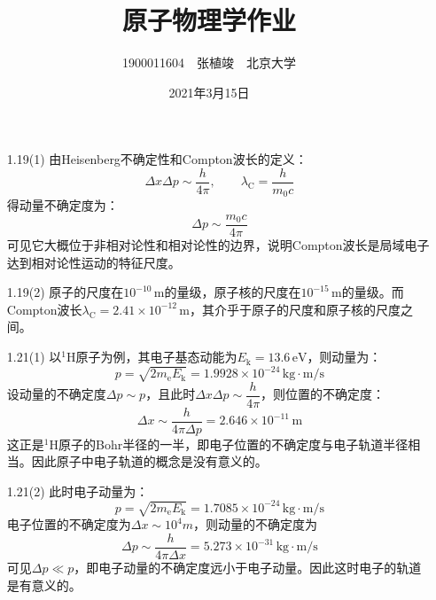 \documentclass[a4paper,fontset=none]{ctexart}
\begin{document}
    \title{\textbf{原子物理学作业}}
    \author{1900011604\ \ 张植竣\ \ 北京大学}
    \date{2021年3月15日}

    \maketitle

    \begin{itemize}

        \subsection*{思考题}

        \item[1.19(1)]
        由Heisenberg不确定性和Compton波长的定义：
        \[
        \Delta x \Delta p \sim \dfrac{h}{4\pi},\qquad \lambda_\mathrm{C} = \frac{h}{m_0 c}
        \]
        得动量不确定度为：
        \[
        \Delta p \sim \frac{m_0 c}{4\pi}
        \]
        可见它大概位于非相对论性和相对论性的边界，说明Compton波长是局域电子达到相对论性运动的特征尺度。

        \item[1.19(2)]
        原子的尺度在$10^{-10}\,\mathrm{m}$的量级，原子核的尺度在$10^{-15}\,\mathrm{m}$的量级。而Compton波长$\lambda_\mathrm{C} = 2.41\times10^{-12}\,\mathrm{m}$，其介乎于原子的尺度和原子核的尺度之间。

        \item[1.21(1)]
        以$\mathrm{^{1}H}$原子为例，其电子基态动能为$E_{\mathrm{k}} = 13.6\,\mathrm{eV}$，则动量为：
        \[
        p = \sqrt{2m_\mathrm{e}E_\mathrm{k}} = 1.9928\times10^{-24}\,\mathrm{kg \cdot m/s}
        \]
        设动量的不确定度$\Delta p \sim p$，且此时$\Delta x \Delta p \sim \dfrac{h}{4\pi}$，则位置的不确定度：
        \[
        \Delta x \sim \frac{h}{4\pi\Delta p} = 2.646\times10^{-11}\,\mathrm{m}
        \]
        这正是$\mathrm{^{1}H}$原子的Bohr半径的一半，即电子位置的不确定度与电子轨道半径相当。因此原子中电子轨道的概念是没有意义的。

        \item[1.21(2)]
        此时电子动量为：
        \[
        p = \sqrt{2m_\mathrm{e}E_\mathrm{k}} = 1.7085\times10^{-24}\,\mathrm{kg \cdot m/s}
        \]
        电子位置的不确定度为$\Delta x \sim 10^{4}m$，则动量的不确定度为
        \[
        \Delta p \sim \frac{h}{4\pi\Delta x} = 5.273\times10^{-31}\,\mathrm{kg \cdot m/s}
        \]
        可见$\Delta p \ll p$，即电子动量的不确定度远小于电子动量。因此这时电子的轨道是有意义的。


\end{itemize}
\end{document}
